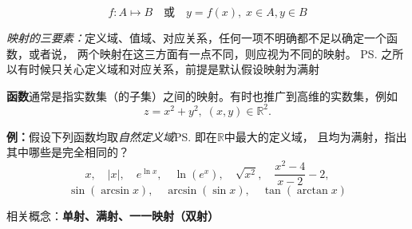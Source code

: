 $$f:A\mapsto B \quad\mbox{或}\quad y=f(x),\;x\in A,y\in B$$

{\it 映射的三要素：}定义域、值域、对应关系，任何一项不明确都不足以确定一个函数，或者说，
两个映射在这三方面有一点不同，则应视为不同的映射。
\ps{之所以有时候只关心定义域和对应关系，前提是默认假设映射为满射}

{\bf 函数}通常是指实数集（的子集）之间的映射。有时也推广到高维的实数集，例如
$$z=x^2+y^2,\;(x,y)\in\mathbb{R}^2.$$

{\bf 例：}假设下列函数均取{\it 自然定义域}\ps{即在$\mathbb{R}$中最大的定义域}，
且均为满射，指出其中哪些是完全相同的？
		$$x,\quad |x|,\quad e^{\ln x},\quad \ln(e^x),\quad \sqrt{x^2},\quad
		\frac{x^2-4}{x-2}-2,$$
		$$\sin(\arcsin x),\quad \arcsin(\sin x), \quad \tan(\arctan x)$$

相关概念：{\bf 单射、满射、一一映射（双射）}

